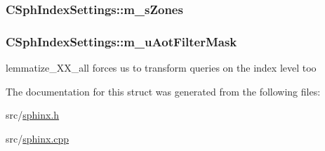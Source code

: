 \hypertarget{structCSphIndexSettings_a0ca140973f3fb0924ef0517bc2c7af2f}{
\subsubsection[{m\-\_\-s\-Zones}]{ C\-Sph\-Index\-Settings\-::m\-\_\-s\-Zones}}\label{structCSphIndexSettings_a0ca140973f3fb0924ef0517bc2c7af2f}
\hypertarget{structCSphIndexSettings_a402ca3e248f758413ee9947d5af1467b}{
\subsubsection[{m\-\_\-u\-Aot\-Filter\-Mask}]{ C\-Sph\-Index\-Settings\-::m\-\_\-u\-Aot\-Filter\-Mask}}\label{structCSphIndexSettings_a402ca3e248f758413ee9947d5af1467b}


lemmatize\-\_\-\-X\-X\-\_\-all forces us to transform queries on the index level too 



The documentation for this struct was generated from the following files\-:\begin{DoxyCompactItemize}
\item 
src/\hyperlink{sphinx_8h}{sphinx.\-h}\item 
src/\hyperlink{sphinx_8cpp}{sphinx.\-cpp}\end{DoxyCompactItemize}
